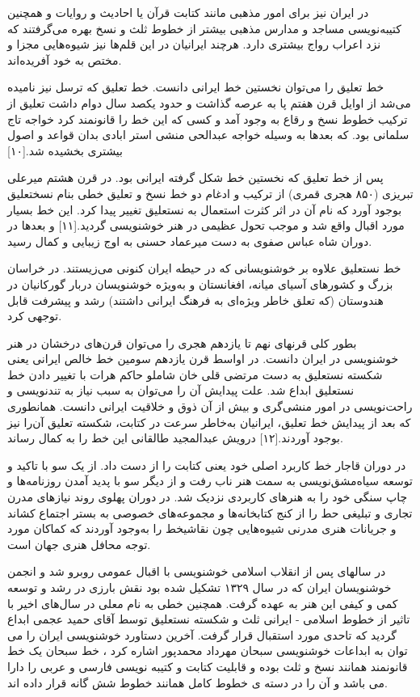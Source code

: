 \documentclass[a4paper]{article}
\begin{document}
در ایران نیز برای امور مذهبی مانند کتابت قرآن یا احادیث و روایات و همچنین کتیبه‌نویسی مساجد و مدارس مذهبی بیشتر از خطوط ثلث و نسخ بهره می‌گرفتند که نزد اعراب رواج بیشتری دارد. هرچند ایرانیان در این قلم‌ها نیز شیوه‌هایی مجزا و مختص به خود آفریده‌اند.

خط تعلیق را می‌توان نخستین خط ایرانی دانست. خط تعلیق که ترسل نیز نامیده می‌شد از اوایل قرن هفتم پا به عرصه گذاشت و حدود یکصد سال دوام داشت تعلیق از ترکیب خطوط نسخ و رقاع به وجود آمد و کسی که این خط را قانونمند کرد خواجه تاج سلمانی بود. که بعدها به وسیله خواجه عبدالحی منشی استر ابادی بدان قواعد و اصول بیشتری بخشیده شد.[۱۰]

پس از خط تعلیق که نخستین خط شکل گرفته ایرانی بود. در قرن هشتم میرعلی تبریزی (۸۵۰ هجری قمری) از ترکیب و ادغام دو خط نسخ و تعلیق خطی بنام نسختعلیق بوجود آورد که نام آن در اثر کثرت استعمال به نستعلیق تغییر پیدا کرد. این خط بسیار مورد اقبال واقع شد و موجب تحول عظیمی در هنر خوشنویسی گردید.[۱۱] و بعدها در دوران شاه عباس صفوی به دست میرعماد حسنی به اوج زیبایی و کمال رسید.

خط نستعلیق علاوه بر خوشنویسانی که در حیطه ایران کنونی می‌زیستند. در خراسان بزرگ و کشورهای آسیای میانه، افغانستان و به‌ویژه خوشنویسان دربار گورکانیان در هندوستان (که تعلق خاطر ویژه‌ای به فرهنگ ایرانی داشتند) رشد و پیشرفت قابل توجهی کرد.

بطور کلی قرنهای نهم تا یازدهم هجری را می‌توان قرن‌های درخشان در هنر خوشنویسی در ایران دانست. در اواسط قرن یازدهم سومین خط خالص ایرانی یعنی شکسته نستعلیق به دست مرتضی قلی خان شاملو حاکم هرات با تغییر دادن خط نستعلیق ابداع شد. علت پیدایش آن را می‌توان به سبب نیاز به تندنویسی و راحت‌نویسی در امور منشی‌گری و بیش از آن ذوق و خلاقیت ایرانی دانست. همانطوری که بعد از پیدایش خط تعلیق، ایرانیان به‌خاطر سرعت در کتابت، شکسته تعلیق آن‌را نیز بوجود آوردند.[۱۲] درویش عبدالمجید طالقانی این خط را به کمال رساند.

در دوران قاجار خط کاربرد اصلی خود یعنی کتابت را از دست داد. از یک سو با تاکید و توسعه سیاه‌مشق‌نویسی به سمت هنر ناب رفت و از دیگر سو با پدید آمدن روزنامه‌ها و چاپ سنگی خود را به هنرهای کاربردی نزدیک شد. در دوران پهلوی روند نیازهای مدرن تجاری و تبلیغی حط را از کنج کتابخانه‌ها و مجموعه‌های خصوصی به بستر اجتماع کشاند و جریانات هنری مدرنی شیوه‌هایی چون نقاشیخط را به‌وجود آوردند که کماکان مورد توجه محافل هنری جهان است.

در سالهای پس از انقلاب اسلامی خوشنویسی با اقبال عمومی روبرو شد و انجمن خوشنویسان ایران که در سال ۱۳۲۹ تشکیل شده بود نقش بارزی در رشد و توسعه کمی و کیفی این هنر به عهده گرفت. همچنین خطی به نام معلی در سال‌های اخیر با تاثیر از خطوط اسلامی - ایرانی ثلث و شکسته نستعلیق توسط آقای حمید عجمی ابداع گردید که تاحدی مورد استقبال قرار گرفت. آخرین دستاورد خوشنویسی ایران را می توان به ابداعات خوشنویسی سبحان مهرداد محمدپور اشاره کرد ، خط سبحان یک خط قانونمند همانند نسخ و ثلث بوده و قابلیت کتابت و کتیبه نویسی فارسی و عربی را دارا می باشد و آن را در دسته ی خطوط کامل همانند خطوط شش گانه قرار داده اند.
\end{document}
